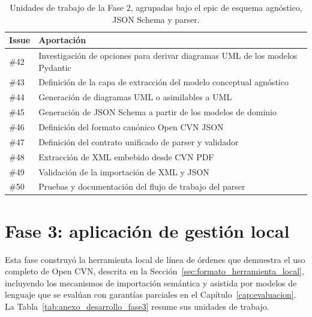 \begin{table}[htbp]
  \centering
  \footnotesize
  \renewcommand{\arraystretch}{1.45}
  \caption{Unidades de trabajo de la Fase 2, agrupadas bajo el epic de esquema agnóstico, JSON Schema y parser.}
  \label{tab:anexo_desarrollo_fase2}
  \begin{tabular}{p{} p{}}
    \hline
    \textbf{Issue} & \textbf{Aportación} \\
    \hline
    \#42 & Investigación de opciones para derivar diagramas UML de los modelos Pydantic \\
    \#43 & Definición de la capa de extracción del modelo conceptual agnóstico \\
    \#44 & Generación de diagramas UML o asimilables a UML \\
    \#45 & Generación de JSON Schema a partir de los modelos de dominio \\
    \#46 & Definición del formato canónico Open CVN JSON \\
    \#47 & Definición del contrato unificado de parser y validador \\
    \#48 & Extracción de XML embebido desde CVN PDF \\
    \#49 & Validación de la importación de XML y JSON \\
    \#50 & Pruebas y documentación del flujo de trabajo del parser \\
    \hline
  \end{tabular}
\end{table}

\section{Fase 3: aplicación de gestión local}
\label{sec:anexo_desarrollo_fase3}

Esta fase construyó la herramienta local de línea de órdenes que demuestra
el uso completo de Open CVN, descrita en la
Sección~\ref{sec:formato_herramienta_local}, incluyendo los mecanismos de
importación semántica y asistida por modelos de lenguaje que se evalúan con
garantías parciales en el Capítulo~\ref{cap:evaluacion}. La
Tabla~\ref{tab:anexo_desarrollo_fase3} resume sus unidades de trabajo.


